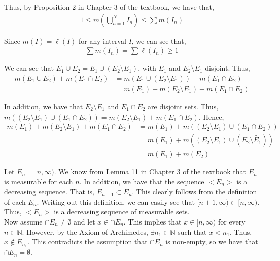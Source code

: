 \documentclass[12pt]{article}
\newenvironment{problem}[2][Problem]{\begin{trivlist}
\item[\hskip \labelsep {\bfseries #1}\hskip \labelsep {\bfseries #2.}]}{\end{trivlist}}
\begin{document}
Thus, by Proposition 2 in Chapter 3 of the textbook, we have that,
\begin{align*}
1 \leq m\left(\bigcup_{n=1}^{N} I_n \right) \leq \sum m(I_n)
\end{align*}

Since $m(I) = \ell(I)$ for any interval $I$, we can see that,
\begin{align*}
\sum m(I_n) = \sum \ell(I_n) \geq 1
\end{align*}

\begin{problem}{2}
\end{problem}

We can see that $E_1 \cup E_2 = E_1 \cup (E_2 \setminus E_1)$, with $E_1$ and $E_2 \setminus E_1$ disjoint. Thus,
\begin{align*}
m(E_1 \cup E_2) + m(E_1 \cap E_2) &= m(E_1 \cup (E_2 \setminus E_1)) + m(E_1 \cap E_2)\\
&= m(E_1) + m(E_2 \setminus E_1) + m(E_1 \cap E_2)
\end{align*}

In addition, we have that $E_2 \setminus E_1$ and $E_1 \cap E_2$ are disjoint sets. Thus, $m((E_2 \setminus E_1) \cup (E_1 \cap E_2)) = m(E_2 \setminus E_1) + m(E_1 \cap E_2)$. Hence,
\begin{align*}
m(E_1) + m(E_2 \setminus E_1) + m(E_1 \cap E_2) &= m(E_1) + m((E_2 \setminus E_1) \cup (E_1 \cap E_2))\\
&= m(E_1) + m((E_2 \setminus E_1) \cup (E_2 \setminus \tilde{E_1}))\\
&= m(E_1) + m(E_2)
\end{align*}
\begin{problem}{3}
\end{problem}

Let $E_n = [n, \infty)$. We know from Lemma 11 in Chapter 3 of the textbook that $E_n$ is measurable for each $n$. In addition, we have that the sequence $<E_n>$ is a decreasing sequence. That is, $E_{n+1} \subset E_n$. This clearly follows from the definition of each $E_n$. Writing out this definition, we can easily see that $[n+1, \infty) \subset [n, \infty)$. Thus, $<E_n>$ is a decreasing sequence of measurable sets.\\

Now assume $\cap E_n \neq \emptyset$ and let $x \in \cap E_n$. This implies that $x \in [n, \infty)$ for every $n \in \mathbb{N}$. However, by the Axiom of Archimedes, $\exists n_1 \in \mathbb{N}$ such that $x < n_1$. Thus, $x \not\in E_{n_1}$. This contradicts the assumption that $\cap E_n$ is non-empty, so we have that $\cap E_n = \emptyset$.\\
\end{document}
